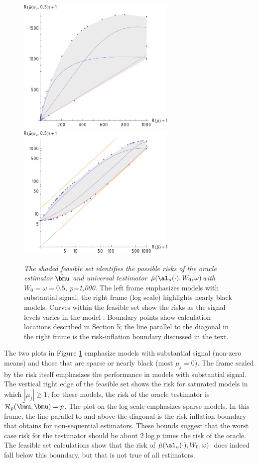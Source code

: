 \documentclass[12pt]{article}
\newcommand{\uTest}{\mbox{$\hat\mu(\al_u(\cdot),W_0,\omega)$}}
\begin{document}
 \begin{figure}
 \caption{ \label{fig:riFeasibleSet} {\sl The shaded feasible set identifies the possible risks 
 of the oracle estimator $\tilde{\bmu}$ and universal testimator \uTest with $W_0=\omega=0.5$, $p$=1,000.} The left frame emphasizes models with substantial signal; the right frame (log scale) highlights nearly black models. Curves within the
 feasible set show the risks as the signal levels varies in the model . Boundary 
 points show calculation locations described in Section 5; the line parallel to the diagonal in
 the right frame is the risk-inflation boundary discussed in the text.}

 \vspace{0.1in}
\centerline{
 \includegraphics[width=3.0in]{figures/riFeasSet}
 \includegraphics[width=3.0in]{figures/riFeasSetLog} }
 \vspace{0.2in}
 \end{figure}


 The two plots in Figure \ref{fig:riFeasibleSet} emphasize
 models with substantial signal (non-zero means) and those that are sparse or
 nearly black (most $\mu_j=0$).  The frame scaled by the risk itself emphasizes
 the performance in models with substantial signal.  The vertical right edge of
 the feasible set shows the risk for saturated models in which $|\mu_j| \ge 1$;
 for these models, the risk of the oracle testimator is ${\cal
 R}_p(\tilde{\bmu}, \bmu) = p$.  The plot on the log scale emphasizes sparse
 models.  In this frame, the line parallel to and above the diagonal is the
 risk-inflation boundary  that obtains for non-sequential estimators.
  These bounds suggest that the worst case risk for the testimator should be
 about $2 \log p$ times the risk of the oracle.  The feasible set calculations
 show that the risk of \uTest\ does indeed fall below this boundary, but that is
 not true of all estimators. 
\end{document}
